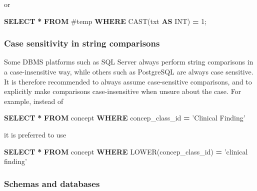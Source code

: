 \documentclass[11pt]{book}
\newenvironment{Shaded}{\begin{snugshade}}{\end{snugshade}}
\newcommand{\DataTypeTok}[1]{\textcolor[rgb]{0.13,0.29,0.53}{#1}}
\newcommand{\DecValTok}[1]{\textcolor[rgb]{0.00,0.00,0.81}{#1}}
\newcommand{\FunctionTok}[1]{\textcolor[rgb]{0.00,0.00,0.00}{#1}}
\newcommand{\KeywordTok}[1]{\textcolor[rgb]{0.13,0.29,0.53}{\textbf{#1}}}
\newcommand{\NormalTok}[1]{#1}
\newcommand{\OperatorTok}[1]{\textcolor[rgb]{0.81,0.36,0.00}{\textbf{#1}}}
\newcommand{\StringTok}[1]{\textcolor[rgb]{0.31,0.60,0.02}{#1}}
\theoremstyle{definition}
\theoremstyle{definition}
\theoremstyle{definition}
\theoremstyle{remark}
\begin{document}
or

\begin{Shaded}
\begin{Highlighting}[]
\KeywordTok{SELECT} \OperatorTok{*} \KeywordTok{FROM}\NormalTok{ #temp }\KeywordTok{WHERE} \FunctionTok{CAST}\NormalTok{(txt }\KeywordTok{AS} \DataTypeTok{INT}\NormalTok{) }\OperatorTok{=} \DecValTok{1}\NormalTok{;}
\end{Highlighting}
\end{Shaded}

\hypertarget{case-sensitivity-in-string-comparisons}{%
\subsubsection*{Case sensitivity in string comparisons}\label{case-sensitivity-in-string-comparisons}}

Some DBMS platforms such as SQL Server always perform string comparisons in a case-insensitive way, while others such as PostgreSQL are always case sensitive. It is therefore recommended to always assume case-sensitive comparisons, and to explicitly make comparisons case-insensitive when unsure about the case. For example, instead of

\begin{Shaded}
\begin{Highlighting}[]
\KeywordTok{SELECT} \OperatorTok{*} \KeywordTok{FROM}\NormalTok{ concept }\KeywordTok{WHERE}\NormalTok{ concep_class_id }\OperatorTok{=} \StringTok{'Clinical Finding'}
\end{Highlighting}
\end{Shaded}

it is preferred to use

\begin{Shaded}
\begin{Highlighting}[]
\KeywordTok{SELECT} \OperatorTok{*} \KeywordTok{FROM}\NormalTok{ concept }\KeywordTok{WHERE} \FunctionTok{LOWER}\NormalTok{(concep_class_id) }\OperatorTok{=} \StringTok{'clinical finding'}
\end{Highlighting}
\end{Shaded}

\hypertarget{schemas-and-databases}{%
\subsubsection*{Schemas and databases}\label{schemas-and-databases}}
\end{document}
